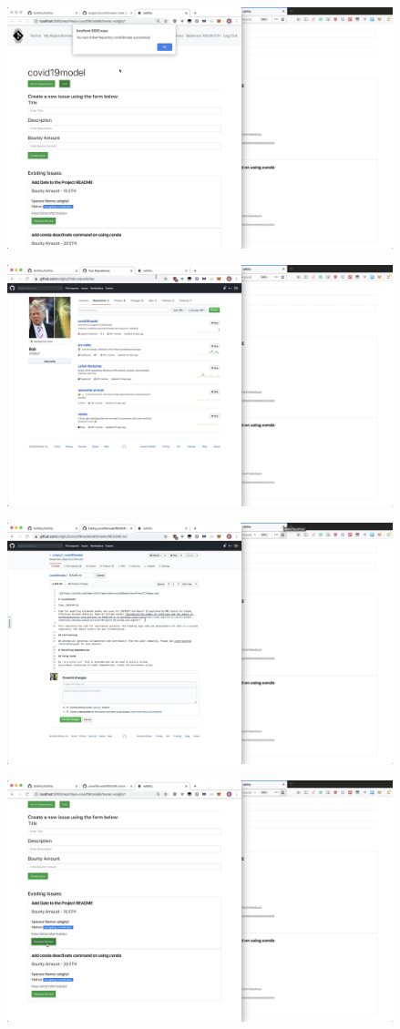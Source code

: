 \documentclass[12pt]{article}
\renewcommand{\_}{\kern-1.5pt\textunderscore\kern-1.5pt}
\begin{document}
\begin{enumerate}
	      \includegraphics[height=7cm]{graphs/31. bob_fork_project}

	      \includegraphics[height=7cm]{graphs/32. bob_forked_github}

	      \includegraphics[height=7cm]{graphs/33. bob_make_changes}

	      \includegraphics[height=7cm]{graphs/34. bob_review_request}


\end{enumerate}
\end{document}

